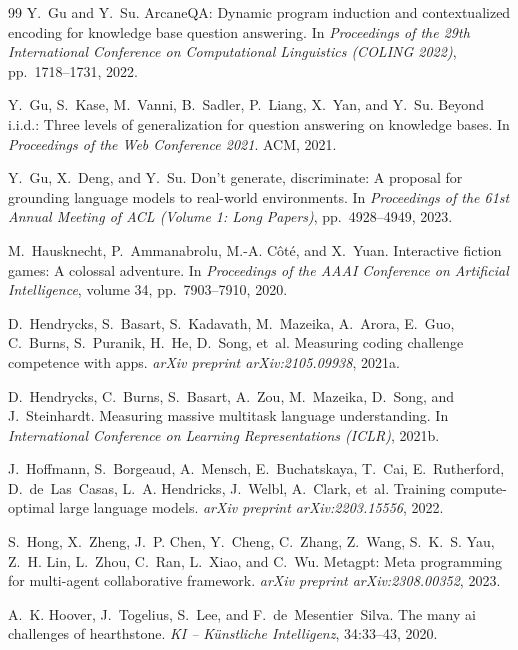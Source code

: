 \begin{thebibliography}{99}
Y.~Gu and Y.~Su.
\newblock ArcaneQA: Dynamic program induction and contextualized encoding
for knowledge base question answering.
\newblock In \emph{Proceedings of the 29th International Conference on
Computational Linguistics (COLING 2022)}, pp.\ 1718--1731, 2022.

Y.~Gu, S.~Kase, M.~Vanni, B.~Sadler, P.~Liang, X.~Yan, and Y.~Su.
\newblock Beyond i.i.d.: Three levels of generalization for question
answering on knowledge bases.
\newblock In \emph{Proceedings of the Web Conference 2021}. ACM, 2021.

Y.~Gu, X.~Deng, and Y.~Su.
\newblock Don't generate, discriminate: A proposal for grounding language
models to real-world environments.
\newblock In \emph{Proceedings of the 61st Annual Meeting of ACL (Volume 1:
Long Papers)}, pp.\ 4928--4949, 2023.

M.~Hausknecht, P.~Ammanabrolu, M.-A. C\^ot\'e, and X.~Yuan.
\newblock Interactive fiction games: A colossal adventure.
\newblock In \emph{Proceedings of the AAAI Conference on Artificial
Intelligence}, volume 34, pp.\ 7903--7910, 2020.

D.~Hendrycks, S.~Basart, S.~Kadavath, M.~Mazeika, A.~Arora, E.~Guo,
C.~Burns, S.~Puranik, H.~He, D.~Song, et~al.
\newblock Measuring coding challenge competence with apps.
\newblock \emph{arXiv preprint arXiv:2105.09938}, 2021a.

D.~Hendrycks, C.~Burns, S.~Basart, A.~Zou, M.~Mazeika, D.~Song, and
J.~Steinhardt.
\newblock Measuring massive multitask language understanding.
\newblock In \emph{International Conference on Learning Representations
(ICLR)}, 2021b.

J.~Hoffmann, S.~Borgeaud, A.~Mensch, E.~Buchatskaya, T.~Cai,
E.~Rutherford, D.~de~Las~Casas, L.~A. Hendricks, J.~Welbl, A.~Clark, et~al.
\newblock Training compute-optimal large language models.
\newblock \emph{arXiv preprint arXiv:2203.15556}, 2022.

S.~Hong, X.~Zheng, J.~P. Chen, Y.~Cheng, C.~Zhang, Z.~Wang,
S.~K.~S. Yau, Z.~H. Lin, L.~Zhou, C.~Ran, L.~Xiao, and C.~Wu.
\newblock Metagpt: Meta programming for multi-agent collaborative
framework.
\newblock \emph{arXiv preprint arXiv:2308.00352}, 2023.

A.~K. Hoover, J.~Togelius, S.~Lee, and F.~de~Mesentier~Silva.
\newblock The many ai challenges of hearthstone.
\newblock \emph{KI -- K\"unstliche Intelligenz}, 34:33--43, 2020.


\end{thebibliography}
